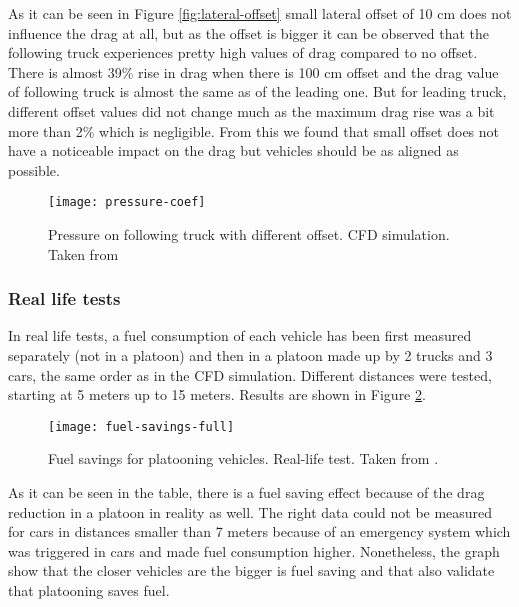 % 
As it can be seen in Figure \ref{fig:lateral-offset} small lateral offset of 10 cm does not influence the drag at all, but as the offset is bigger it can be observed that the following truck experiences pretty high values of drag compared to no offset. There is almost 39\% rise in drag when there is 100 cm offset and the drag value of following truck is almost the same as of the leading one. But for leading truck, different offset values did not change much as the maximum drag rise was a bit more than 2\% which is negligible. From this we found that small offset does not have a noticeable impact on the drag but vehicles should be as aligned as possible.\par
%
\begin{figure}[ht]
    \centering
    \texttt{[image: pressure-coef]}
    \caption{Pressure on following truck with different offset. CFD simulation. Taken from \cite[p. 19]{Laxhammar2015CooperativeConsumption}}
    \label{fig:pressure-coef}
\end{figure}
% 
% 
\subsubsection*{Real life tests}
In real life tests, a fuel consumption of each vehicle has been first measured separately (not in a platoon) and then in a platoon made up by 2 trucks and 3 cars, the same order as in the CFD simulation. Different distances were tested, starting at 5 meters up to 15 meters. Results are shown in Figure \ref{fig:fuel-savings-full}.
% 
\begin{figure}[ht]
    \centering
    \texttt{[image: fuel-savings-full]}
    \caption{Fuel savings for platooning vehicles. Real-life test. Taken from \cite[p. 36]{Chan2012ProjectSARTRE}.}
    \label{fig:fuel-savings-full}
\end{figure}
% 
As it can be seen in the table, there is a fuel saving effect because of the drag reduction in a platoon in reality as well. The right data could not be measured for cars in distances smaller than 7 meters because of an emergency system which was triggered in cars and made fuel consumption higher. Nonetheless, the graph show that the closer vehicles are the bigger is fuel saving and that also validate that platooning saves fuel.